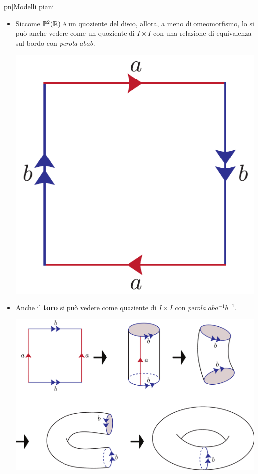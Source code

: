\begin{example}{pn}[Modelli piani]~{}
		\begin{itemize}
		\item Siccome $\mathbb{P}^2(\mathbb{R})$ è un quoziente del disco, allora, a meno di omeomorfismo, lo si può anche vedere come un quoziente di $I\times I$ con una relazione di equivalenza sul bordo con \textit{parola} $abab$.
		\begin{center}
		\includegraphics[trim=0cm 0cm 0cm 0cm, clip, scale=0.375]{images/proj.pdf}
		\end{center}
		\item Anche il \textbf{toro} si può vedere come quoziente di $I\times I$ con \textit{parola} $aba^{-1}b^{-1}$.
		\begin{center}
			\includegraphics[trim=0cm 0cm 0cm 0cm, clip, scale=0.375]{images/torus.pdf}

\end{center}
\end{itemize}
\end{example}
